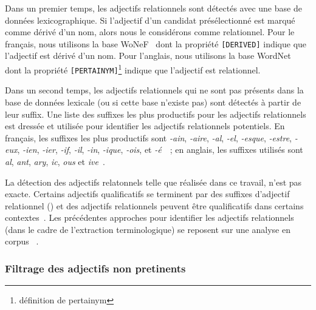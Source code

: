         Dans un premier temps, les adjectifs relationnels sont détectés avec une
        base de données lexicographique. Si l'adjectif d'un candidat
        présélectionné est marqué comme dérivé d'un nom, alors nous le
        considérons comme relationnel. Pour le français, nous utilisons la base
        WoNeF~\cite{pradet2013wonef} dont la propriété \texttt{[DERIVED]}
        indique que l'adjectif est dérivé d'un nom. Pour l'anglais, nous
        utilisons la base  WordNet~\cite{miller1995wordnet} dont la propriété
        \texttt{[PERTAINYM]}\footnote{définition de pertainym} indique que
        l'adjectif est relationnel.

        Dans un second temps, les adjectifs relationnels qui ne sont pas
        présents dans la base de données lexicale (ou si cette base n'existe
        pas) sont détectés à partir de leur suffix. Une liste des suffixes les
        plus productifs pour les adjectifs relationnels est dressée et utilisée
        pour identifier les adjectifs relationnels potentiels. En français, les
        suffixes les plus productifs sont \textit{-ain}, \textit{-aire},
        \textit{-al}, \textit{-el}, \textit{-esque}, \textit{-estre},
        \textit{-eux}, \textit{-ien}, \textit{-ier}, \textit{-if}, \textit{-il},
        \textit{-in}, \textit{-ique}, \textit{-ois}, et
        \textit{-é}~\cite{guyon1993adjectifsrelationnels}~; en anglais, les
        suffixes utilisés sont \textit{al}, \textit{ant},
        \textit{ary}, \textit{ic}, \textit{ous} et
        \textit{ive}~\cite{grabar2006terminologystructuring}.

        La détection des adjectifs relatonnels telle que réalisée dans ce
        travail, n'est pas exacte. Certains adjectifs qualificatifs se terminent
        par des suffixes d'adjectif relationnel () et des
        adjectifs relationnels peuvent être qualificatifs dans certains
        contextes~\cite{daille2001relationaladjectives}. Les précédentes
        approches pour identifier les adjectifs relationnels (dans le cadre de
        l'extraction terminologique) se reposent sur une analyse en
        corpus~\cite{daille2001relationaladjectives,maniez2005automaticrelationaladjectiveidentification,harastani2013relationaladjectivetranslation}
        .

      \subsubsection{Filtrage des adjectifs non pretinents}
      \label{subsubsec:main-automatic_keyphrase_annotation-keyphrase_candidate_selection-modifiers_filtering-adjective_filtering}

